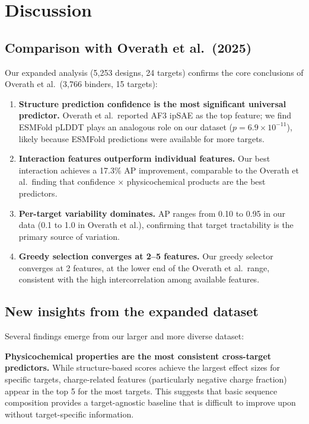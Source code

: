 \documentclass[11pt,a4paper]{article}
\begin{document}
\section{Discussion}

\subsection{Comparison with Overath et al.\ (2025)}

Our expanded analysis (5,253 designs, 24 targets) confirms the core conclusions of Overath et al.\ (3,766 binders, 15 targets):

\begin{enumerate}
    \item \textbf{Structure prediction confidence is the most significant universal predictor.} Overath et al.\ reported AF3 ipSAE as the top feature; we find ESMFold pLDDT plays an analogous role on our dataset ($p = 6.9 \times 10^{-11}$), likely because ESMFold predictions were available for more targets.

    \item \textbf{Interaction features outperform individual features.} Our best interaction achieves a 17.3\% AP improvement, comparable to the Overath et al.\ finding that confidence $\times$ physicochemical products are the best predictors.

    \item \textbf{Per-target variability dominates.} AP ranges from 0.10 to 0.95 in our data (0.1 to 1.0 in Overath et al.), confirming that target tractability is the primary source of variation.

    \item \textbf{Greedy selection converges at 2--5 features.} Our greedy selector converges at 2 features, at the lower end of the Overath et al.\ range, consistent with the high intercorrelation among available features.
\end{enumerate}

\subsection{New insights from the expanded dataset}

Several findings emerge from our larger and more diverse dataset:

\textbf{Physicochemical properties are the most consistent cross-target predictors.}
While structure-based scores achieve the largest effect sizes for specific targets, charge-related features (particularly negative charge fraction) appear in the top 5 for the most targets.
This suggests that basic sequence composition provides a target-agnostic baseline that is difficult to improve upon without target-specific information.
\end{document}
